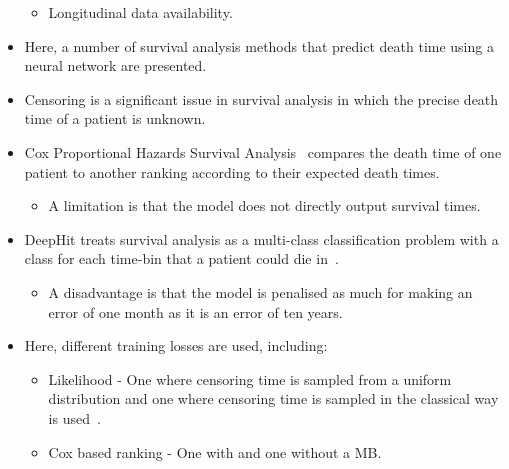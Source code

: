 \documentclass[landscape, color=UCLburgundy, margin=1cm]{uclposter}
\begin{document}
\begin{multicols}{2}
\begin{multicols}{2}
\begin{highlightbox}[UCLlightgreen]
\begin{itemize}
\begin{itemize}
                            \item Longitudinal data availability.
                        \end{itemize}
    
                        \item Here, a number of survival analysis methods that predict death time using a neural network are presented.
    
                        \item Censoring is a significant issue in survival analysis in which the precise death time of a patient is unknown.
                        
                        \item Cox Proportional Hazards Survival Analysis~\cite{Cox1972RegressionLife-Tables} compares the death time of one patient to another ranking according to their expected death times.
    
                        \begin{itemize}
                            \item A limitation is that the model does not directly output survival times.
                        \end{itemize}
    
                        \item DeepHit treats survival analysis as a multi-class classification problem with a class for each time-bin that a patient could die in~\cite{Lee2018DeepHit:Risks}.
                        
                        \begin{itemize}
                            \item A disadvantage is that the model is penalised as much for making an error of one month as it is an error of ten years.
                        \end{itemize}
    
                        \item Here, different training losses are used, including:
    
                        \begin{itemize}
                            \item Likelihood -  One where censoring time is sampled from a uniform distribution and one where censoring time is sampled in the classical way is used~\cite{Shahin2023DeepAnalysis}.
                            
                            \item Cox based ranking - One with and one without a \gls{MB}.
                            

\end{itemize}
\end{itemize}
\end{highlightbox}
\end{multicols}
\end{multicols}
\end{document}
